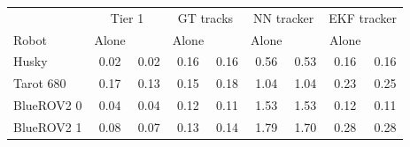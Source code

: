 \begin{tabular}{lcccccccc}
\toprule
 & \multicolumn{2}{c}{Tier 1} & \multicolumn{2}{c}{GT tracks} & \multicolumn{2}{c}{NN tracker} & \multicolumn{2}{c}{EKF tracker} \\
Robot & Alone & \avatar{} & Alone & \avatar{} & Alone & \avatar{} & Alone & \avatar{} \\
\midrule
Husky & 0.02 & 0.02 & 0.16 & 0.16 & 0.56 & 0.53 & 0.16 & 0.16 \\
Tarot 680 & 0.17 & 0.13 & 0.15 & 0.18 & 1.04 & 1.04 & 0.23 & 0.25 \\
BlueROV2 0 & 0.04 & 0.04 & 0.12 & 0.11 & 1.53 & 1.53 & 0.12 & 0.11 \\
BlueROV2 1 & 0.08 & 0.07 & 0.13 & 0.14 & 1.79 & 1.70 & 0.28 & 0.28 \\
\bottomrule
\end{tabular}
